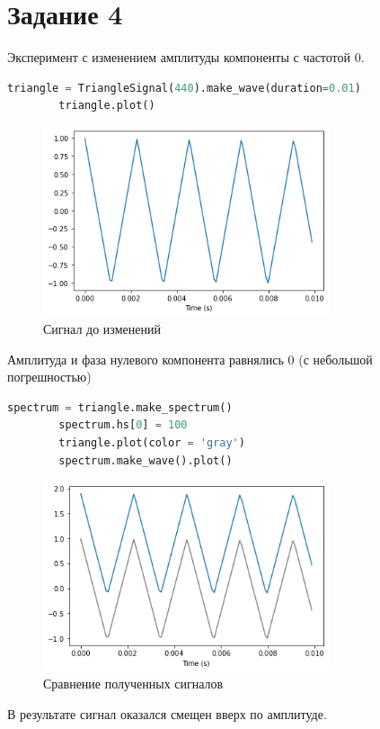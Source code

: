 \documentclass[a4paper, 12pt]{report}
\begin{document}
	\section{Задание 4}
	Эксперимент с изменением амплитуды компоненты с частотой 0.
	 \begin{lstlisting}[language=Python,caption=Создаем треугольный сигнал]
		triangle = TriangleSignal(440).make_wave(duration=0.01)
		triangle.plot()
	\end{lstlisting}
	\begin{figure}[H]
		\centering
		\includegraphics[width=0.75\textwidth]{segment2.png}
		\caption{Сигнал до изменений}
		\label{fig:segment2}
	\end{figure}
		Амплитуда и фаза нулевого компонента равнялись 0 (с небольшой погрешностью)
	\begin{lstlisting}[language=Python,caption=Изменяем амплитуду]
		spectrum = triangle.make_spectrum()
		spectrum.hs[0] = 100
		triangle.plot(color = 'gray')
		spectrum.make_wave().plot()
	\end{lstlisting}
	\begin{figure}[H]
		\centering
		\includegraphics[width=0.75\textwidth]{sr3.png}
		\caption{Сравнение полученных сигналов}
		\label{fig:sr3}
	\end{figure}
	В результате сигнал оказался смещен вверх по амплитуде.
	
\end{document}
